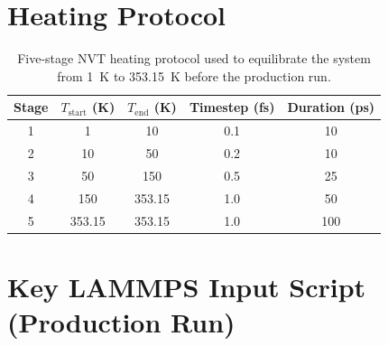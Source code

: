 \documentclass[12pt,a4paper]{report}
\begin{document}
\section{Heating Protocol}

\begin{table}[h]
\centering
\caption{Five-stage NVT heating protocol used to equilibrate 
the system from 1~K to 353.15~K before the production run.}
\label{tab:heating}
\begin{tabular}{ccccc}
\toprule
Stage & $T_\text{start}$ (K) & $T_\text{end}$ (K) & 
Timestep (fs) & Duration (ps) \\
\midrule
1 & 1    & 10    & 0.1 & 10 \\
2 & 10   & 50    & 0.2 & 10 \\
3 & 50   & 150   & 0.5 & 25 \\
4 & 150  & 353.15 & 1.0 & 50 \\
5 & 353.15 & 353.15 & 1.0 & 100 \\
\bottomrule
\end{tabular}
\end{table}

\section{Key LAMMPS Input Script (Production Run)}
\end{document}
